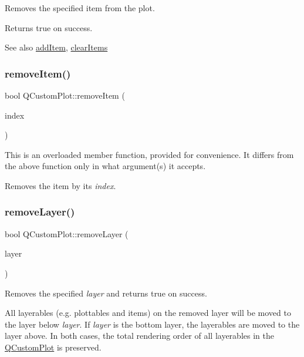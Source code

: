 Removes the specified item from the plot.

Returns true on success.

\begin{DoxySeeAlso}{See also}
\mbox{\hyperlink{class_q_custom_plot_aa500620379262321685cb7a7674cbd2a}{add\+Item}}, \mbox{\hyperlink{class_q_custom_plot_abdfd07d4f0591d0cf967f85013fd3645}{clear\+Items}} 
\end{DoxySeeAlso}
\mbox{\label{class_q_custom_plot_abcfdda3d601c0441cab136137d715dea}} 
\subsubsection{\texorpdfstring{remove\+Item()}{removeItem()}\hspace{0.1cm}{\footnotesize\ttfamily [2/2]}}
{\footnotesize\ttfamily bool Q\+Custom\+Plot\+::remove\+Item (\begin{DoxyParamCaption}\item[{int}]{index }\end{DoxyParamCaption})}

This is an overloaded member function, provided for convenience. It differs from the above function only in what argument(s) it accepts.

Removes the item by its {\itshape index}. \mbox{\label{class_q_custom_plot_a40f75e342c5eaab6a86066a42a0e2a94}} 
\subsubsection{\texorpdfstring{remove\+Layer()}{removeLayer()}}
{\footnotesize\ttfamily bool Q\+Custom\+Plot\+::remove\+Layer (\begin{DoxyParamCaption}\item[{\mbox{\hyperlink{class_q_c_p_layer}{Q\+C\+P\+Layer}} $\ast$}]{layer }\end{DoxyParamCaption})}

Removes the specified {\itshape layer} and returns true on success.

All layerables (e.\+g. plottables and items) on the removed layer will be moved to the layer below {\itshape layer}. If {\itshape layer} is the bottom layer, the layerables are moved to the layer above. In both cases, the total rendering order of all layerables in the \mbox{\hyperlink{class_q_custom_plot}{Q\+Custom\+Plot}} is preserved.


